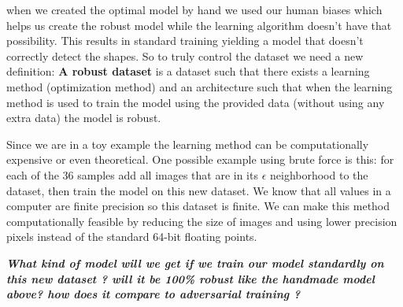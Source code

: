 \documentclass[../thesis.tex]{subfiles}
\begin{document}
	
	
	when we created the optimal model by hand we used our human biases which helps us create the robust model while the learning algorithm doesn't have that possibility. This results in standard training yielding a model that doesn't correctly detect the shapes. So to truly control the dataset we need a new definition:
	\textbf{A robust dataset} is a dataset such that there exists a learning method (optimization method) and an architecture such that when the learning method is used to train the model using the provided data (without using any extra data) the model is robust. 
	
	Since we are in a toy example the learning method can be computationally expensive or even theoretical. One possible example using brute force is this: for each of the 36 samples add all images that are in its $\epsilon$ neighborhood to the dataset, then train the model on this new dataset. We know that all values in a computer are finite precision so this dataset is finite. We can make this method computationally feasible by reducing the size of images and using lower precision pixels instead of the standard 64-bit floating points.
	
	\begin{center}
		\textit{\textbf{What kind of model will we get if we train our model standardly on this new dataset ? will it be 100\% robust like the handmade model above? how does it compare to adversarial training ?}}
	\end{center}
\end{document}
